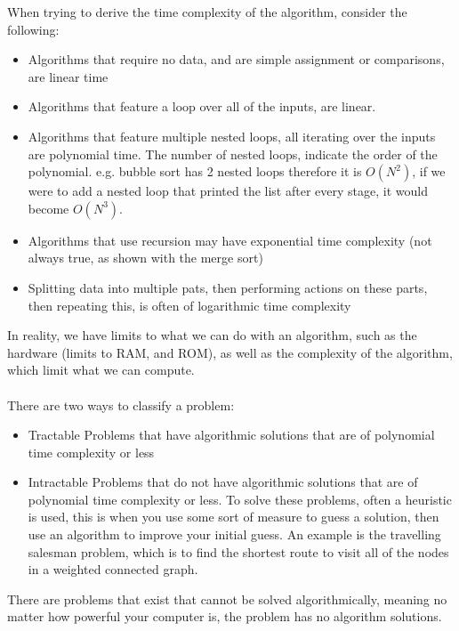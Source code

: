   When trying to derive the time complexity of the algorithm, consider the following:
  \begin{itemize}
  	\item Algorithms that require no data, and are simple assignment or comparisons, are linear time
  	\item Algorithms that feature a loop over all of the inputs, are linear.
  	\item Algorithms that feature multiple nested loops, all iterating over the inputs are polynomial time. The number of nested loops, indicate the order of the polynomial. e.g. bubble sort has 2 nested loops therefore it is $O(N^2)$, if we were to add a nested loop that printed the list after every stage, it would become $O(N^3)$.
  	\item Algorithms that use recursion may have exponential time complexity (not always true, as shown with the merge sort)
  	\item Splitting data into multiple pats, then performing actions on these parts, then repeating this, is often of logarithmic time complexity
  \end{itemize}
  
  \noindent
  In reality, we have limits to what we can do with an algorithm, such as the hardware (limits to RAM, and ROM), as well as the complexity of the algorithm, which limit what we can compute.\\ \\
  \noindent 
  There are two ways to classify a problem:
  \begin{itemize}
  	\item Tractable
	  	\subitem Problems that have algorithmic solutions that are of polynomial time complexity or less
  	\item Intractable
	  	\subitem Problems that do not have algorithmic solutions that are of polynomial time complexity or less. To solve these problems, often a heuristic is used, this is when you use some sort of measure to guess a solution, then use an algorithm to improve your initial guess. An example is the travelling salesman problem, which is to find the shortest route to visit all of the nodes in a weighted connected graph.
  \end{itemize}
  
  \noindent
  There are problems that exist that cannot be solved algorithmically, meaning no matter how powerful your computer is, the problem has no algorithm solutions.
  
